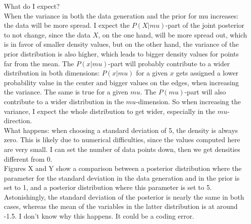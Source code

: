 \documentclass{article}
\begin{document}
What do I expect? 
\\
When the variance in both the data generation and the prior for mu increases: the data will be more spread. I expect the $P(X|mu)$-part of the joint posterior to not change, since the data $X$, on the one hand, will be more spread out, which is in favor of smaller density values, but on the other hand, the variance of the prior distribution is also higher, which leads to bigger density values for points far from the mean. The $P(x|mu)$-part will probably contribute to a wider distribution in both dimensions: $P(x|mu)$ for a given $x$ gets assigned a lower probability value in the center and bigger values on the edges, when increasing the variance. The same is true for a given $mu$. The $P(mu)$-part will also contribute to a wider distribution in the $mu$-dimension.
So when increasing the variance, I expect the whole distribution to get wider, especially in the $mu$-direction.
\\
What happens: when choosing a standard deviation of 5, the density is always zero. This is likely due to numerical difficulties, since the values computed here are very small.
I can set the number of data points down, then we get densities different from 0.
\\
Figures  X and Y show a comparison between a posterior distribution where the parameter for the standard deviation in the data generation and in the prior is set to 1, and a posterior distribution where this parameter is set to 5. Astonishingly, the standard deviation of the posterior is nearly the same in both cases, whereas the mean of the variables in the latter distribution is at around -1.5. I don't know why this happens. It could be a coding error.
\end{document}
